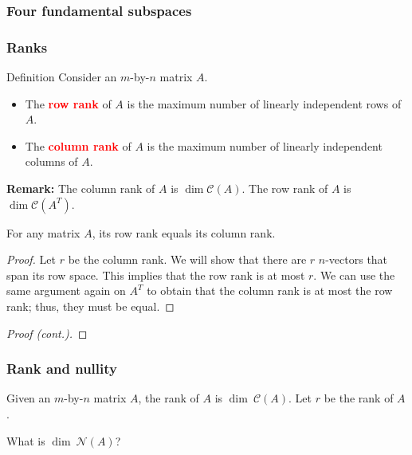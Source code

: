 \begin{frame}
  \frametitle{Four fundamental subspaces}
\end{frame}

\begin{frame}
  \frametitle{Ranks}

  \begin{block}{Definition}
    Consider an $m$-by-$n$ matrix $A$.
    \begin{itemize}
    \item The \textcolor{red}{\bf row rank} of $A$ is the maximum
      number of linearly independent rows of $A$.
    \item The \textcolor{red}{\bf column rank} of $A$ is the maximum
      number of linearly independent columns of $A$.
    \end{itemize}
  \end{block}

  \vspace{0.2in}

  {\bf Remark:} The column rank of $A$ is $\dim {\mathcal C}(A)$.  The
  row rank of $A$ is $\dim {\mathcal C}(A^T)$.
\end{frame}

\begin{frame}
  \begin{theorem}
    For any matrix $A$, its row rank equals its column rank.
  \end{theorem}

  \begin{proof}
    Let $r$ be the column rank.  We will show that there are $r$
    $n$-vectors that span its row space.  This implies that the row
    rank is at most $r$.  We can use the same argument again on $A^T$
    to obtain that the column rank is at most the row rank; thus, they
    must be equal.

    \vspace{1.5in}
  \end{proof}
  
\end{frame}

\begin{frame}
  \begin{proof}[Proof (cont.)]
    \vspace{3in}
  \end{proof}
\end{frame}

\begin{frame}
  \frametitle{Rank and nullity}

  Given an $m$-by-$n$ matrix $A$, the rank of $A$ is $\dim~{\mathcal
    C}(A)$.  Let $r$ be the rank of $A$.

  What is $\dim~{\mathcal N}(A)$?

  \vspace{2.5in}
\end{frame}

